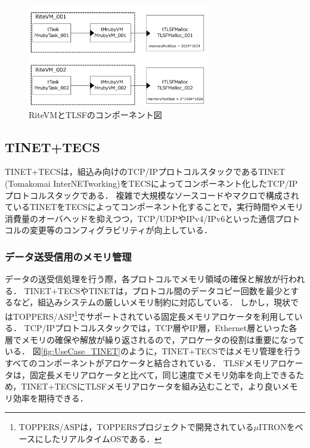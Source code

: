 \documentclass[submit,techrep]{ipsj_v2/UTF8/ipsj}
\begin{document}
\begin{figure}[t]
    \centering
    \includegraphics[width=8cm,clip]{figure/UseCase_mruby.pdf}
    \caption{RiteVMとTLSFのコンポーネント図}
    \label{fig:UseCase_mruby}
\end{figure}
    
\subsection{TINET+TECS}
\label{sec:TINET+TECS}

TINET+TECSは，組込み向けのTCP/IPプロトコルスタックであるTINET (Tomakomai InterNETworking)\cite{url:TINET}\cite{par:TINET}をTECSによってコンポーネント化したTCP/IPプロトコルスタックである\cite{par:TINET+TECS}．
複雑で大規模なソースコードやマクロで構成されているTINETをTECSによってコンポーネント化することで，実行時間やメモリ消費量のオーバヘッドを抑えつつ，TCP/UDPやIPv4/IPv6といった通信プロトコルの変更等のコンフィグラビリティが向上している．

\subsubsection{データ送受信用のメモリ管理}

データの送受信処理を行う際，各プロトコルでメモリ領域の確保と解放が行われる．
TINET+TECSやTINETは，プロトコル間のデータコピー回数を最少とするなど，組込みシステムの厳しいメモリ制約に対応している．
しかし，現状ではTOPPERS/ASP\footnote{TOPPERS/ASPは，TOPPERSプロジェクトで開発されている$\mu$ITRON\cite{par:microITRON}をベースにしたリアルタイムOSである．}でサポートされている固定長メモリアロケータを利用している．
TCP/IPプロトコルスタックでは，TCP層やIP層，Ethernet層といった各層でメモリの確保や解放が繰り返されるので，アロケータの役割は重要になっている．
図\ref{fig:UseCase_TINET}のように，TINET+TECSではメモリ管理を行うすべてのコンポーネントがアロケータと結合されている．
TLSFメモリアロケータは，固定長メモリアロケータと比べて，同じ速度でメモリ効率を向上できるため，TINET+TECSにTLSFメモリアロケータを組み込むことで，より良いメモリ効率を期待できる．
\end{document}
